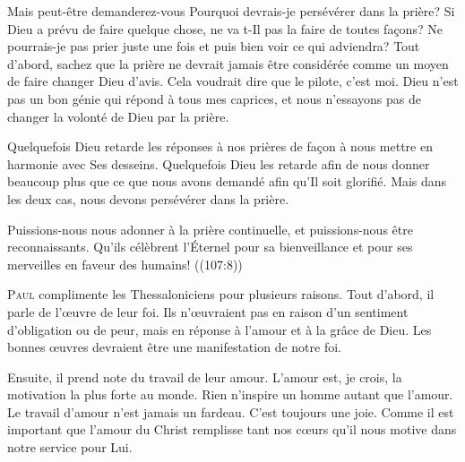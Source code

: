 
Mais peut-être demanderez-vous\frcolon{} 
 \Og Pourquoi devrais-je persévérer dans la prière?
 Si Dieu a prévu de faire quelque chose, ne va t-Il pas la faire
 de toutes fa\c{c}ons? Ne pourrais-je pas prier juste une fois et puis bien voir
 ce qui adviendra? \Fg{}
 Tout d'abord, sachez que la prière ne devrait jamais être considérée
 comme un moyen de faire changer Dieu d'avis.
 Cela voudrait dire que le pilote, c'est moi.
 Dieu n'est pas un bon génie qui répond à tous mes caprices,
 et nous n'essayons pas de changer la volonté de Dieu par la prière.

Quelquefois Dieu retarde les réponses à nos prières de fa\c{c}on à nous mettre
 en harmonie avec Ses desseins. Quelquefois Dieu les retarde afin de nous
 donner beaucoup plus que ce que nous avons demandé afin qu'Il soit glorifié.
 Mais dans les deux cas, nous devons persévérer dans la prière.

Puissions-nous nous adonner à la prière continuelle, et puissions-nous
 être reconnaissants.
 \Og Qu'ils célèbrent l'Éternel pour sa bienveillance et pour ses merveilles
 en faveur des humains! \Fg{} ((107:8))

\dvrule






\lettrine{P}{aul} complimente les Thessaloniciens pour plusieurs raisons.
 Tout d'abord, il parle de l'\oe{}uvre de leur foi.
 Ils n'\oe{}uvraient pas en raison d'un sentiment d'obligation ou de peur,
 mais en réponse à l'amour et à la grâce de Dieu.
 Les bonnes \oe{}uvres devraient être une manifestation de notre foi.

Ensuite, il prend note du travail de leur amour. L'amour est, je crois,
 la motivation la plus forte au monde. Rien n'inspire un homme autant
 que l'amour. Le travail d'amour n'est jamais un fardeau.
 C'est toujours une joie. Comme il est important que l'amour du Christ
 remplisse tant nos c\oe{}urs qu'il nous motive dans notre service pour Lui.

